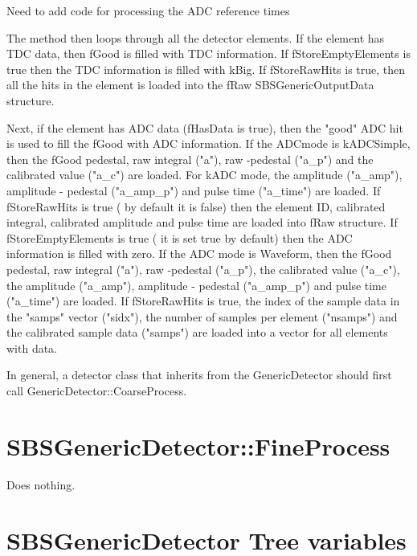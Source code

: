 \documentclass[11pt]{article}
\begin{document}
 {\color{red} Need to add code for processing the ADC reference times}
 
 The method then loops through all the detector elements. 
If the element has TDC data, then fGood is filled with TDC information. If  fStoreEmptyElements is true then the TDC information is filled with kBig. If fStoreRawHits is true, then all the hits in the element is
loaded into the fRaw SBSGenericOutputData structure.

Next, if the element has ADC data (fHasData is true), then the "good" ADC 
hit is used to fill the fGood with ADC information.
If the ADCmode is kADCSimple, then the fGood pedestal, raw integral ("a"), raw -pedestal ("a\_p")
and the calibrated value ("a\_c") are loaded. For kADC mode, the amplitude ("a\_amp"),
amplitude - pedestal ("a\_amp\_p") and pulse time ("a\_time") are loaded. If fStoreRawHits is true ( by default it is false) then the element ID, 
calibrated integral,
calibrated amplitude and pulse time are loaded into fRaw structure. 
 If  fStoreEmptyElements is true ( it is set true by default) then the ADC information is filled with zero.
 If the ADC mode is Waveform, then the  fGood pedestal, raw integral ("a"), raw -pedestal ("a\_p"), 
 the calibrated value ("a\_c"), the amplitude ("a\_amp"),
 amplitude - pedestal ("a\_amp\_p") and pulse time ("a\_time") are loaded. If fStoreRawHits is true, the
 index of the sample data in the "samps" vector ("sidx"), the number of samples per element ("nsamps") and the
 calibrated sample data ("samps") are loaded into a vector for all elements with data.

 
 In general, a detector class that inherits from the GenericDetector should first call GenericDetector::CoarseProcess.
 

 \section{SBSGenericDetector::FineProcess}
 Does nothing.
 

\section{SBSGenericDetector Tree variables}
\end{document}

